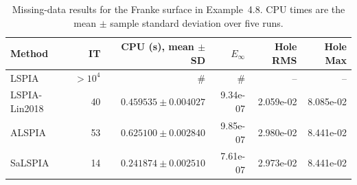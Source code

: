 \begin{table}[t]
\centering
\caption{Missing-data results for the Franke surface in Example~4.8. CPU times are the mean $\pm$ sample standard deviation over five runs.}
\label{tab:missing_franke_cpu_sd}
\begin{tabular}{lrrrrr}
\hline
Method & IT & CPU (s), mean $\pm$ SD & $E_\infty$ & Hole RMS & Hole Max \\
\hline
LSPIA & $>10^4$ & \# & \# & -- & -- \\
LSPIA-Lin2018 & 40 & $0.459535 \pm 0.004027$ & 9.34e-07 & 2.059e-02 & 8.085e-02 \\
ALSPIA & 53 & $0.625100 \pm 0.002840$ & 9.85e-07 & 2.980e-02 & 8.441e-02 \\
SaLSPIA & 14 & $0.241874 \pm 0.002510$ & 7.61e-07 & 2.973e-02 & 8.441e-02 \\
\hline
\end{tabular}
\end{table}
